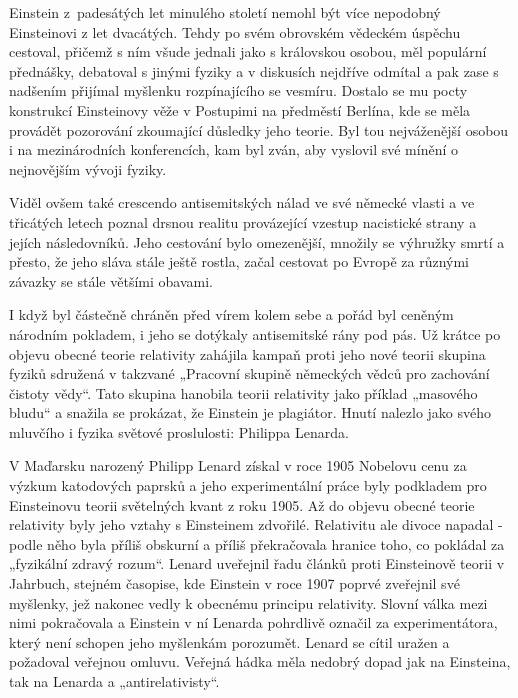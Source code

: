   Einstein z padesátých let minulého století nemohl být více nepodobný Einsteinovi z let dvacátých.
  Tehdy po svém obrovském vědeckém úspěchu cestoval, přičemž s ním všude jednali jako s královskou
  osobou, měl populární přednášky, debatoval s jinými fyziky a v diskusích nejdříve odmítal a pak
  zase s nadšením přijímal myšlenku rozpínajícího se vesmíru. Dostalo se mu pocty konstrukcí
  Einsteinovy věže v Postupimi na předměstí Berlína, kde se měla provádět pozorování zkoumající
  důsledky jeho teorie. Byl tou nejváženější osobou i na mezinárodních konferencích, kam byl zván,
  aby vyslovil své mínění o nejnovějším vývoji fyziky. 
  
  Viděl ovšem také crescendo antisemitských nálad ve své německé vlasti a ve třicátých letech poznal
  drsnou realitu provázející vzestup nacistické strany a jejích následovníků. Jeho cestování bylo
  omezenější, množily se výhružky smrtí a přesto, že jeho sláva stále ještě rostla, začal cestovat
  po Evropě za různými závazky se stále většími obavami. 
  
  I když byl částečně chráněn před vírem kolem sebe a pořád byl ceněným národním pokladem, i jeho se
  dotýkaly antisemitské rány pod pás. Už krátce po objevu obecné teorie relativity zahájila kampaň
  proti jeho nové teorii skupina fyziků sdružená v takzvané „Pracovní skupině německých vědců pro
  zachování čistoty vědy“. Tato skupina hanobila teorii relativity jako příklad „masového bludu“ a
  snažila se prokázat, že Einstein je plagiátor. Hnutí nalezlo jako svého mluvčího i fyzika světové
  proslulosti: Philippa Lenarda. 
  
  V Maďarsku narozený Philipp Lenard získal v roce 1905 Nobelovu cenu za výzkum katodových paprsků a
  jeho experimentální práce byly podkladem pro Einsteinovu teorii světelných kvant z roku 1905. Až
  do objevu obecné teorie relativity byly jeho vztahy s Einsteinem zdvořilé. Relativitu ale divoce
  napadal - podle něho byla příliš obskurní a příliš překračovala hranice toho, co pokládal za
  „fyzikální zdravý rozum“. Lenard uveřejnil řadu článků proti Einsteinově teorii v Jahrbuch,
  stejném časopise, kde Einstein v roce 1907 poprvé zveřejnil své myšlenky, jež nakonec vedly k
  obecnému principu relativity. Slovní válka mezi nimi pokračovala a Einstein v ní Lenarda pohrdlivě
  označil za experimentátora, který není schopen jeho myšlenkám porozumět. Lenard se cítil uražen a
  požadoval veřejnou omluvu. Veřejná hádka měla nedobrý dopad jak na Einsteina, tak na Lenarda a
  „antirelativisty“. 
  
